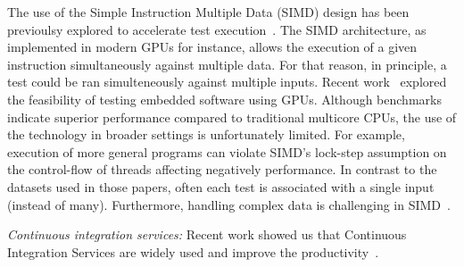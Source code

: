 The use of the Simple Instruction Multiple Data (SIMD) design has been
previoulsy explored to accelerate test
execution~\cite{damorim-etal-issta2007,damorim-etal-tse2008,kim-etal-issre2012,nguyen-etal-icse2014,rajan-etal-ase2014,sen-etal-fse2015,yaneva-etal-issta2017}. The
SIMD architecture, as implemented in modern GPUs for instance, allows
the execution of a given instruction simultaneously against multiple
data.  For that reason, in principle, a test could be ran
simulteneously against multiple inputs.  Recent
work~\cite{rajan-etal-ase2014,yaneva-etal-issta2017} explored the
feasibility of testing embedded software using GPUs.  Although
benchmarks indicate superior performance compared to traditional
multicore CPUs, the use of the technology in broader settings is
unfortunately limited. For example, execution of more general programs
can violate SIMD's lock-step assumption on the control-flow of threads
affecting negatively performance. In contrast to the datasets used in
those papers, often each test is associated with a single input
(instead of many).  Furthermore, handling complex data is challenging
in SIMD~\cite{damorim-etal-issta2007,damorim-etal-tse2008}.




\textit{Continuous integration services:}
Recent work showed us that Continuous Integration Services are widely
used and improve the productivity~\cite{hilton-etal-ase2016}. 


